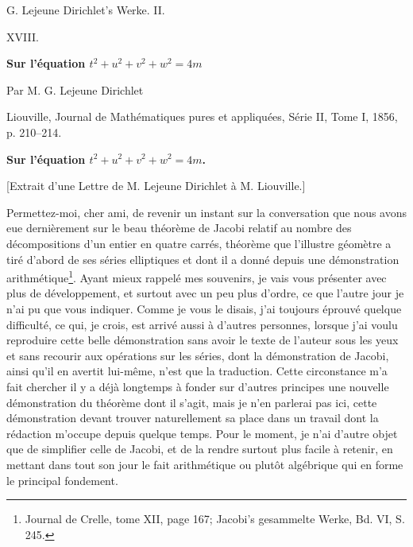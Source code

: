 \documentclass[11pt]{article}
\begin{document}
\begin{center}
{\Large G. Lejeune Dirichlet's Werke. II.}\par\vspace{1.2em}
{\Large XVIII.}\par\vspace{0.5em}
{\LARGE \textbf{Sur l'équation \(t^2+u^2+v^2+w^2=4m\)}}\par\vspace{1em}
{\large Par M. G. Lejeune Dirichlet}\par\vspace{0.5em}
{\small Liouville, Journal de Mathématiques pures et appliquées, Série II, Tome I, 1856, p. 210--214.}
\end{center}

\bigskip
\begin{center}
{\large \textbf{Sur l'équation \(t^2+u^2+v^2+w^2=4m\).}}
\end{center}

\begin{center}
[Extrait d'une Lettre de M. Lejeune Dirichlet à M. Liouville.]
\end{center}

Permettez-moi, cher ami, de revenir un instant sur la conversation que nous avons eue dernièrement sur le beau théorème de Jacobi relatif au nombre des décompositions d'un entier en quatre carrés, théorème que l'illustre géomètre a tiré d'abord de ses séries elliptiques et dont il a donné depuis une démonstration arithmétique\footnote{Journal de Crelle, tome XII, page 167; Jacobi's gesammelte Werke, Bd. VI, S. 245.}. Ayant mieux rappelé mes souvenirs, je vais vous présenter avec plus de développement, et surtout avec un peu plus d'ordre, ce que l'autre jour je n'ai pu que vous indiquer. Comme je vous le disais, j'ai toujours éprouvé quelque difficulté, ce qui, je crois, est arrivé aussi à d'autres personnes, lorsque j'ai voulu reproduire cette belle démonstration sans avoir le texte de l'auteur sous les yeux et sans recourir aux opérations sur les séries, dont la démonstration de Jacobi, ainsi qu'il en avertit lui-même, n'est que la traduction. Cette circonstance m'a fait chercher il y a déjà longtemps à fonder sur d'autres principes une nouvelle démonstration du théorème dont il s'agit, mais je n'en parlerai pas ici, cette démonstration devant trouver naturellement sa place dans un travail dont la rédaction m'occupe depuis quelque temps. Pour le moment, je n'ai d'autre objet que de simplifier celle de Jacobi, et de la rendre surtout plus facile à retenir, en mettant dans tout son jour le fait arithmétique ou plutôt algébrique qui en forme le principal fondement.
\end{document}
